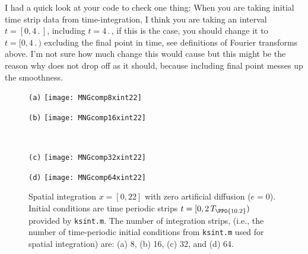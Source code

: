 \begin{description}
{I had a quick look at your code to check one thing: When you are taking initial
time strip data from time-integration, I think you are taking an interval
$t = [0, 4 \period{}]$, including $t = 4 \period{}$, if this is the case, you
should change it to $t = [0, 4 \period{})$ excluding the final point in time,
see definitions of Fourier transforms above. I'm not sure how much change this
would cause but this might be the reason why  does
not drop off as it should, because including final point messes up the
smoothness.
}

\begin{figure}[h]
  \begin{minipage}[height=.20\textheight]{.25\textwidth}
    \centering \small{\texttt{(a)}}
    \texttt{[image: MNGcomp8xint22]}
  \end{minipage}
  \begin{minipage}[height=.20\textheight]{.25\textwidth}
    \centering \small{\texttt{(b)}}
    \texttt{[image: MNGcomp16xint22]}
  \end{minipage}
  \\
  \begin{minipage}[height=.20\textheight]{.25\textwidth}
    \centering \small{\texttt{(c)}}
    \texttt{[image: MNGcomp32xint22]}
  \end{minipage}
  \centering
  \begin{minipage}[height=.20\textheight]{.25\textwidth}
    \centering \small{\texttt{(d)}}
    \texttt{[image: MNGcomp64xint22]}
  \end{minipage}
   \caption{
   Spatial integration $x=[0,22]$ with zero artificial diffusion ($e=0$).
   Initial conditions are time periodic strips $t = [0,
   2\,T_{\PPO{10.2}})$ provided by \texttt{ksint.m}. The number of
   integration strips, (i.e., the number of time-periodic initial
   conditions from \texttt{ksint.m} used for spatial integration)
   are: (a) 8, (b) 16, (c) 32, and (d) 64.
   }
  \label{fig:MNGcompxint2}
\end{figure}

\end{description}
